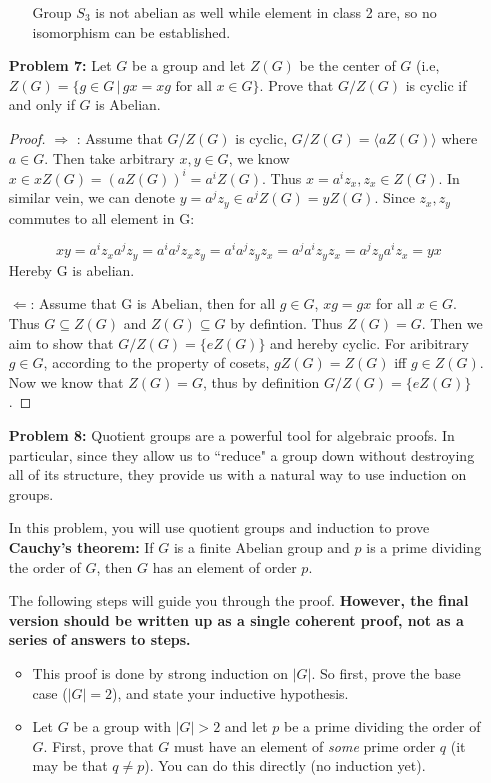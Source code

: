 \documentclass[11pt, oneside]{article}
\begin{document}
\begin{enumerate}
\begin{enumerate}
    Group $S_3$ is not abelian as well while element in class 2 are, so no isomorphism can be established.
    
\end{enumerate}
\newpage
\item[{\bf Problem 7:}] Let $G$ be a group and let $Z(G)$ be the center of $G$ (i.e, $Z(G) = \{g\in G\,|\, gx=xg \text{ for all } x\in G\}$. Prove that $G/Z(G)$ is cyclic if and only if $G$ is Abelian.
\begin{proof}
$\Rightarrow$ : Assume that $G/Z(G)$ is cyclic, $G/Z(G)=\langle aZ(G) \rangle $ where $a\in G$. Then take arbitrary $x,y\in G$, we know $x\in xZ(G)=(aZ(G))^i=a^iZ(G)$. Thus $x=a^iz_x, z_x\in Z(G)$. In similar vein, we can denote $y=a^jz_y \in a^jZ(G)=yZ(G)$. Since $z_x, z_y$ commutes to all element in G:

\[xy= a^iz_x a^jz_y=a^ia^jz_x z_y=a^ia^jz_yz_x= a^ja^iz_yz_x=a^jz_ya^iz_x=yx\]
Hereby G is abelian.

$\Leftarrow$: Assume that G is Abelian, then for all $g\in G$, $xg=gx$ for all $x\in G$. Thus $G\subseteq Z(G)$ and $Z(G)\subseteq G$ by defintion. Thus $Z(G)=G$. Then we aim to show that $G/Z(G)=\{eZ(G)\}$ and hereby cyclic. For aribitrary $g\in G$, according to the property of cosets, $gZ(G)=Z(G)$ iff $g\in Z(G)$. Now we know that $Z(G)=G$, thus by definition $G/Z(G)=\{eZ(G)\}$.
\end{proof}
\newpage

\item[{\bf Problem 8:}]
Quotient groups are a powerful tool for algebraic proofs. In particular, since they allow us to ``reduce" a group down without destroying all of its structure, they provide us with a natural way to use induction on groups.

 In this problem, you will use quotient groups and induction to prove {\bf Cauchy's theorem:}  If $G$ is a finite Abelian group and $p$ is a prime dividing the order of $G$, then $G$ has an element of order $p$. 

The following steps will guide you through the proof. {\bf However, the final version should be written up as a single coherent proof, not as a series of answers to steps.}

\begin{itemize}
\item This proof is done by strong induction on $|G|$. So first, prove the base case ($|G|=2$), and state your inductive hypothesis.

\item Let $G$ be a group with $|G|>2$ and let $p$ be a prime dividing the order of $G$.  First, prove that $G$ must have an element of {\it some} prime order $q$ (it may be that $q\neq p$). You can do this directly (no induction yet).


\end{itemize}
\end{enumerate}
\end{document}
